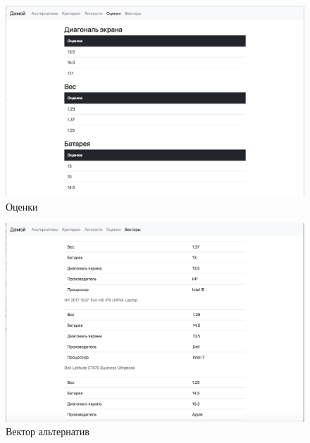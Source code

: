 \documentclass[titlepage]{article}
\begin{document}
\begin{figure}
\includegraphics[scale=0.4]{marks}
\caption{Оценки}
\label{fig:marks}
\end{figure}

\begin{figure}
\includegraphics[scale=0.4]{vectors}
\caption{Вектор альтернатив}
\label{fig:vectors}
\end{figure}
\end{document}
